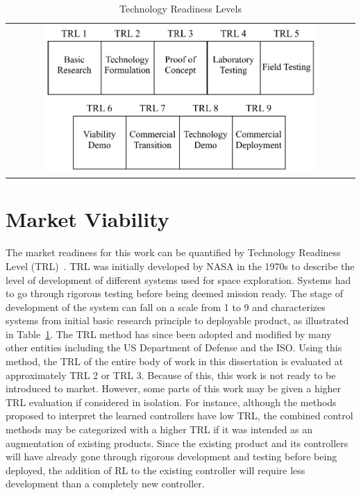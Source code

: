 %
\begin{table}[tb]
    \begin{center}
      \setlength{\tabcolsep}{6pt}
      \caption{Technology Readiness Levels}
      \begin{tabular}{c}
      \includegraphics[width=0.8\textwidth]{figures/figures_commercialization/TRL table.pdf}
      \label{table:TRL}
      \end{tabular}
    \end{center}
\end{table}
%

\section{Market Viability}
The market readiness for this work can be quantified by Technology Readiness Level (TRL)~\cite{Mankins:2009a,Kimmel:2020a}. TRL was initially developed by NASA in the 1970s to describe the level of development of different systems used for space exploration. Systems had to go through rigorous testing before being deemed mission ready. The stage of development of the system can fall on a scale from 1 to 9 and characterizes systems from initial basic research principle to deployable product, as illustrated in Table~\ref{table:TRL}. The TRL method has since been adopted and modified by many other entities including the US Department of Defense and the ISO. Using this method, the TRL of the entire body of work in this dissertation is evaluated at approximately TRL 2 or TRL 3. Because of this, this work is not ready to be introduced to market. However, some parts of this work may be given a higher TRL evaluation if considered in isolation. For instance, although the methods proposed to interpret the learned controllers have low TRL,
%
the combined control methods may be categorized with a higher TRL if it was intended as an augmentation of existing products. Since the existing product and its controllers will have already gone through rigorous development and testing before being deployed, the addition of RL to the existing controller will require less development than a completely new controller.
%

